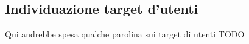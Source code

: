 \subsection{Individuazione target d'utenti}
    \begin{flushleft}
        Qui andrebbe spesa qualche parolina sui target di utenti TODO
    \end{flushleft}
        
